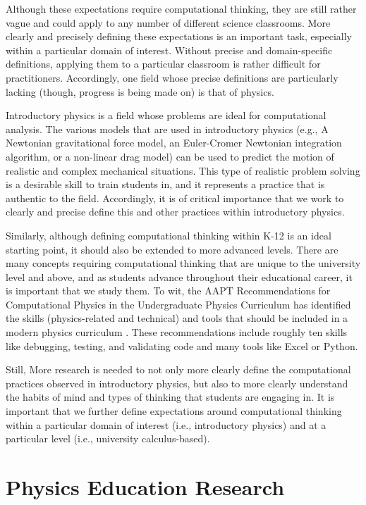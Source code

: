 \documentclass{msuphddissertation}
\begin{document}
\begin{doublespace}
Although these expectations require computational thinking, they are still rather vague and could apply to any number of different science classrooms.  More clearly and precisely defining these expectations is an important task, especially within a particular domain of interest.  Without precise and domain-specific definitions, applying them to a particular classroom is rather difficult for practitioners.  Accordingly, one field whose precise definitions are particularly lacking (though, progress is being made on) is that of physics.

Introductory physics is a field whose problems are ideal for computational analysis.  The various models that are used in introductory physics (e.g., A Newtonian gravitational force model, an Euler-Cromer Newtonian integration algorithm, or a non-linear drag model) can be used to predict the motion of realistic and complex mechanical situations.  This type of realistic problem solving is a desirable skill to train students in, and it represents a practice that is authentic to the field.  Accordingly, it is of critical importance that we work to clearly and precise define this and other practices within introductory physics.

Similarly, although defining computational thinking within K-12 is an ideal starting point, it should also be extended to more advanced levels.  There are many concepts requiring computational thinking that are unique to the university level and above, and as students advance throughout their educational career, it is important that we study them.  To wit, the AAPT Recommendations for Computational Physics in the Undergraduate Physics Curriculum has identified the skills (physics-related and technical) and tools that should be included in a modern physics curriculum \cite{AAPT2016}.  These recommendations include roughly ten skills like debugging, testing, and validating code and many tools like Excel or Python.

Still, More research is needed to not only more clearly define the computational practices observed in introductory physics, but also to more clearly understand the habits of mind and types of thinking that students are engaging in.  It is important that we further define expectations around computational thinking within a particular domain of interest (i.e., introductory physics) and at a particular level (i.e., university calculus-based).

\section{Physics Education Research}


\end{doublespace}
\end{document}
